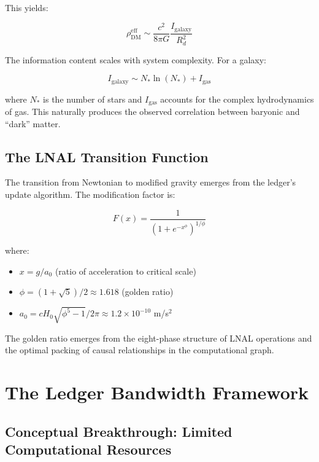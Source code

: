 \documentclass[12pt,letterpaper]{article}
\begin{document}
This yields:

\begin{equation}
\rho_{\text{DM}}^{\text{eff}} \sim \frac{c^2}{8\pi G} \frac{I_{\text{galaxy}}}{R_d^2}
\label{eq:rho_DM_scale}
\end{equation}

The information content scales with system complexity. For a galaxy:

\begin{equation}
I_{\text{galaxy}} \sim N_* \ln(N_*) + I_{\text{gas}}
\label{eq:I_galaxy}
\end{equation}

where $N_*$ is the number of stars and $I_{\text{gas}}$ accounts for the complex hydrodynamics of gas. This naturally produces the observed correlation between baryonic and ``dark'' matter.

\subsection{The LNAL Transition Function}

The transition from Newtonian to modified gravity emerges from the ledger's update algorithm. The modification factor is:

\begin{equation}
F(x) = \frac{1}{(1 + e^{-x^\phi})^{1/\phi}}
\label{eq:F_transition}
\end{equation}

where:
\begin{itemize}
\item $x = g/a_0$ (ratio of acceleration to critical scale)
\item $\phi = (1+\sqrt{5})/2 \approx 1.618$ (golden ratio)
\item $a_0 = cH_0\sqrt{\phi^5-1}/2\pi \approx 1.2 \times 10^{-10}$ m/s$^2$
\end{itemize}

The golden ratio emerges from the eight-phase structure of LNAL operations and the optimal packing of causal relationships in the computational graph.

\section{The Ledger Bandwidth Framework}
\label{sec:bandwidth}

\subsection{Conceptual Breakthrough: Limited Computational Resources}
\end{document}
